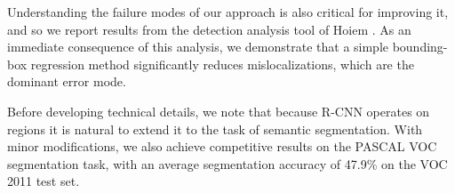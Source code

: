 Understanding the failure modes of our approach is also critical for improving it, and so we report results from the detection analysis tool of Hoiem \etal
\cite{hoiem2012diagnosing}.
As an immediate consequence of this analysis, we demonstrate that a simple bounding-box regression method significantly reduces mislocalizations, which are the dominant error mode.

Before developing technical details, we note that because R-CNN operates on regions it is natural to extend it to the task of semantic segmentation.
With minor modifications, we also achieve competitive results on the PASCAL VOC segmentation task, with an average segmentation accuracy of 47.9\% on the VOC 2011 test set.
